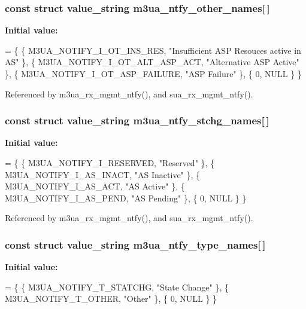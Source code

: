 \subsubsection[{m3ua\+\_\+ntfy\+\_\+other\+\_\+names}]{\setlength{\rightskip}{0pt plus 5cm}const struct value\+\_\+string m3ua\+\_\+ntfy\+\_\+other\+\_\+names[$\,$]}\label{m3ua_8c_aa8ec421eaf92b35c2d0a1d70c9e69c6e}
{\bfseries Initial value\+:}
\begin{DoxyCode}
= \{
        \{ M3UA_NOTIFY_I_OT_INS_RES,     \textcolor{stringliteral}{"Insufficient ASP Resouces active in AS"} \},
        \{ M3UA_NOTIFY_I_OT_ALT_ASP_ACT, \textcolor{stringliteral}{"Alternative ASP Active"} \},
        \{ M3UA_NOTIFY_I_OT_ASP_FAILURE, \textcolor{stringliteral}{"ASP Failure"} \},
        \{ 0, NULL \}
\}
\end{DoxyCode}


Referenced by m3ua\+\_\+rx\+\_\+mgmt\+\_\+ntfy(), and sua\+\_\+rx\+\_\+mgmt\+\_\+ntfy().

\subsubsection[{m3ua\+\_\+ntfy\+\_\+stchg\+\_\+names}]{\setlength{\rightskip}{0pt plus 5cm}const struct value\+\_\+string m3ua\+\_\+ntfy\+\_\+stchg\+\_\+names[$\,$]}\label{m3ua_8c_a336c3d71f1928545474640e45077bc88}
{\bfseries Initial value\+:}
\begin{DoxyCode}
= \{
        \{ M3UA_NOTIFY_I_RESERVED,       \textcolor{stringliteral}{"Reserved"} \},
        \{ M3UA_NOTIFY_I_AS_INACT,       \textcolor{stringliteral}{"AS Inactive"} \},
        \{ M3UA_NOTIFY_I_AS_ACT,         \textcolor{stringliteral}{"AS Active"} \},
        \{ M3UA_NOTIFY_I_AS_PEND,        \textcolor{stringliteral}{"AS Pending"} \},
        \{ 0, NULL \}
\}
\end{DoxyCode}


Referenced by m3ua\+\_\+rx\+\_\+mgmt\+\_\+ntfy(), and sua\+\_\+rx\+\_\+mgmt\+\_\+ntfy().

\subsubsection[{m3ua\+\_\+ntfy\+\_\+type\+\_\+names}]{\setlength{\rightskip}{0pt plus 5cm}const struct value\+\_\+string m3ua\+\_\+ntfy\+\_\+type\+\_\+names[$\,$]}\label{m3ua_8c_a0ce1a526587558d83d657b761f3c62c4}
{\bfseries Initial value\+:}
\begin{DoxyCode}
= \{
        \{ M3UA_NOTIFY_T_STATCHG,        \textcolor{stringliteral}{"State Change"} \},
        \{ M3UA_NOTIFY_T_OTHER,          \textcolor{stringliteral}{"Other"} \},
        \{ 0, NULL \}
\}
\end{DoxyCode}


